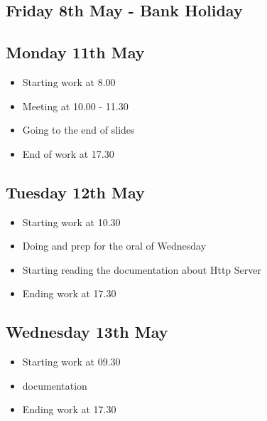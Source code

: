 \documentclass[a4paper, 10pt]{article}
\begin{document}
\subsection*{Friday 8th May - Bank Holiday}

\subsection*{Monday 11th May}
\begin{itemize}
    \item Starting work at 8.00
    \item Meeting at 10.00 - 11.30
    \item Going to the end of slides
    \item End of work at 17.30
\end{itemize}

\subsection*{Tuesday 12th May}
\begin{itemize}
    \item Starting work at 10.30
    \item Doing and prep for the oral of Wednesday
    \item Starting reading the documentation about Http Server
    \item Ending work at 17.30
\end{itemize}

\subsection*{Wednesday 13th May}
\begin{itemize}
    \item Starting work at 09.30
    \item documentation
    \item Ending work at 17.30
\end{itemize}
\end{document}
